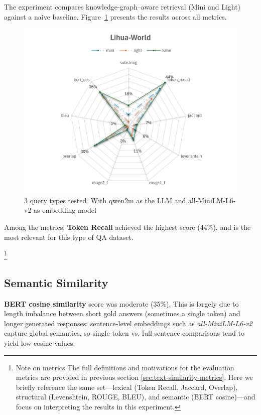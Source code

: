 The experiment compares knowledge-graph–aware retrieval (Mini and Light) against a naive baseline.
Figure~\ref{fig:Lihua-World} presents the results across all metrics.
\begin{figure}[H]
    \centering
    \includegraphics[width=1\linewidth]{Figures/Lihua-World.jpg}
    \caption{3 query types tested. With qwen2m as the \gls{LLM} and all-MiniLM-L6-v2 as embedding model}
    \label{fig:Lihua-World}
\end{figure}
Among the metrics, \textbf{Token Recall} achieved the highest score (44\%), and is the most relevant for this type of QA dataset.

\footnote{Note on metrics The full definitions and motivations for the evaluation metrics are provided in previous section \ref{sec:text-similarity-metrics}. Here we briefly reference the same set—lexical (Token Recall, Jaccard, Overlap), structural (Levenshtein, ROUGE, BLEU), and semantic (\gls{BERT} cosine)—and focus on interpreting the results in this experiment.}

\subsection{Semantic Similarity}
	\textbf{\gls{BERT} cosine similarity} score was moderate (35\%). This is largely due to length imbalance between short gold answers (sometimes a single token) and longer generated responses: sentence-level embeddings such as \textit{all-MiniLM-L6-v2} capture global semantics, so single-token vs. full-sentence comparisons tend to yield low cosine values.


